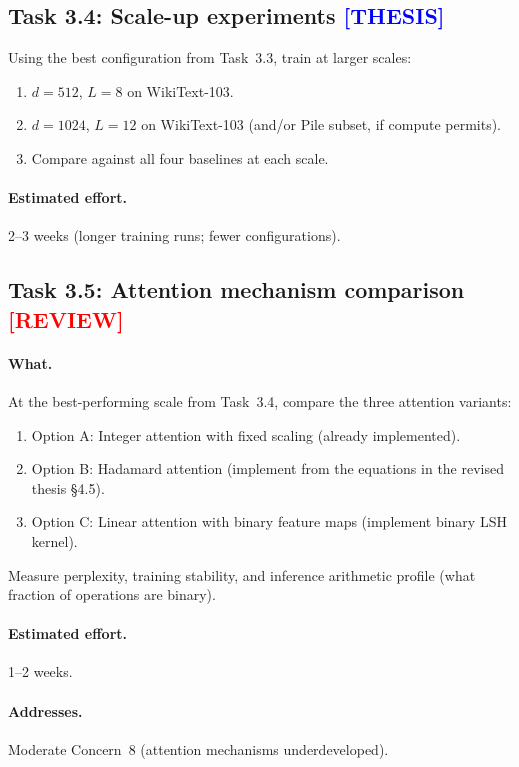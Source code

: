 \documentclass[12pt,a4paper]{article}
\newcommand{\review}{\texorpdfstring{\textcolor{red}{\textbf{[REVIEW]}}}{[REVIEW]}}
\newcommand{\thesis}{\texorpdfstring{\textcolor{blue}{\textbf{[THESIS]}}}{[THESIS]}}
\begin{document}
\subsection{Task 3.4: Scale-up experiments \thesis}

Using the best configuration from Task~3.3, train at larger scales:
\begin{enumerate}
    \item $d = 512$, $L = 8$ on WikiText-103.
    \item $d = 1024$, $L = 12$ on WikiText-103 (and/or Pile subset, if compute permits).
    \item Compare against all four baselines at each scale.
\end{enumerate}

\paragraph{Estimated effort.} 2--3 weeks (longer training runs; fewer configurations).


\subsection{Task 3.5: Attention mechanism comparison \review}

\paragraph{What.} At the best-performing scale from Task~3.4, compare the three attention variants:
\begin{enumerate}
    \item Option A: Integer attention with fixed scaling (already implemented).
    \item Option B: Hadamard attention (implement from the equations in the revised thesis \S4.5).
    \item Option C: Linear attention with binary feature maps (implement binary LSH kernel).
\end{enumerate}

Measure perplexity, training stability, and inference arithmetic profile (what fraction of operations are binary).

\paragraph{Estimated effort.} 1--2 weeks.

\paragraph{Addresses.} Moderate Concern~8 (attention mechanisms underdeveloped).
\end{document}
